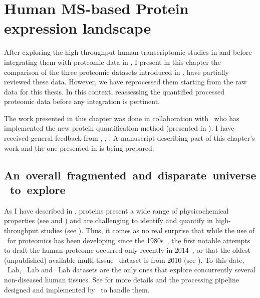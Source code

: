 \chapter{Human MS-based Protein expression landscape}\label{ch:proteomics}

\setlength{\epigraphwidth}{0.7\textwidth}
    \setlength{\epigraphrule}{0pt}

After exploring the high-throughput human transcriptomic studies
in 
and before integrating them with proteomic data in ,
I present in this chapter the comparison of
the three proteomic datasets introduced in .
\citet{Ezkurdia2014-qx,Deutsch2015} have partially reviewed these data.
However, we have reprocessed them starting from the raw data
for this thesis.
In this context, reassessing the quantified processed proteomic data
before any integration is pertinent.\mybr\

The work presented in this chapter was done in collaboration with \james\
who has implemented the new protein quantification method
(presented in ).
I have received general feedback from \alvis, \mar,
\sarah.
A manuscript describing part of this chapter's work
and the one presented in  is being prepared.\mybr\

\section{An~overall~fragmented~and~disparate~universe~to~explore}

As I have described in ,
proteins present a wide range of physicochemical properties
(see  and )
and are challenging to identify and quantify
in high-throughput studies (see ).
Thus, it comes as no real surprise that
while the use of \ms\ for proteomics has been developing since the 1980s~,
the first notable attempts to draft the human proteome occurred only recently
in 2014~\mycite{PandeyData,KusterData},
or that the oldest (unpublished) available multi-tissue \cutler\ dataset is from 2010
(see \Cref{subsec:cutler}).
To this date,
\cutler\ Lab, \kuster\ Lab and \pandey\ Lab datasets are the only ones
that explore concurrently several non-diseased human tissues.
See  for more details and
the processing pipeline designed and implemented by \james\ to handle them.\mybr\

